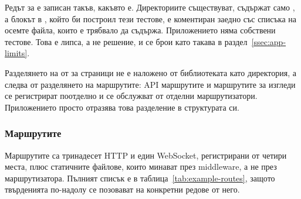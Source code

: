 Редът за  е записан такъв, какъвто е. Директориите съществуват, съдържат само
, а блокът в , който би построил тези тестове, е
коментиран заедно със списъка на осемте файла, които е трябвало да съдържа. Приложението
няма собствени тестове. Това е липса, а не решение, и се брои като такава в
раздел~\ref{ssec:app-limits}.

Разделянето на  от  за страници не е наложено от
библиотеката като директория, а следва от разделянето на маршрутите: API маршрутите и
маршрутите за изгледи се регистрират поотделно и се обслужват от отделни маршрутизатори.
Приложението просто отразява това разделение в структурата си.

\subsubsection{Маршрутите}

Маршрутите са тринадесет HTTP и един WebSocket, регистрирани от четири места, плюс
статичните файлове, които минават през middleware, а не през маршрутизатора. Пълният
списък е в таблица~\ref{tab:example-routes}, защото твърденията по-надолу се позовават на
конкретни редове от него.

